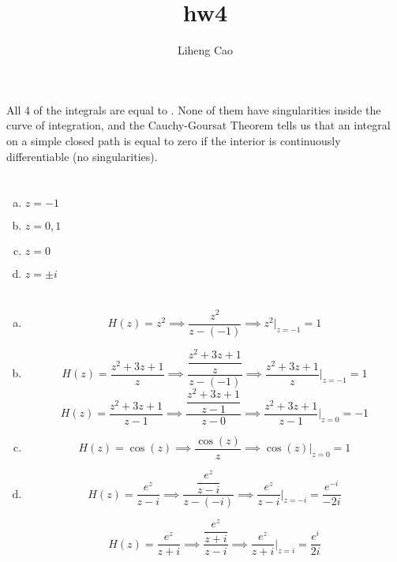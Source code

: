 \documentclass[12pt]{article}
\title{hw4}
\author{Liheng Cao}
\begin{document}
\maketitle

\section{}
All 4 of the integrals are equal to . None of them have singularities inside the curve of integration, and the Cauchy-Goursat Theorem tells us that an integral on a simple closed path is equal to zero if the interior is continuously differentiable (no singularities).
\newpage

\section{}
\begin{enumerate}[a)]
	\item $ z=-1 $
	
	\item $ z = 0, 1 $
	
	\item $ z = 0 $
	
	\item $ z = \pm{i} $
\end{enumerate}
\newpage

\section{}
\begin{enumerate}[a)]
	\item \[ H(z) = z^2 \implies \dfrac{z^2}{z-(-1)} \implies z^2\Bigg|_{z=-1} = \boxed{1}\]
	
	\item \[ H(z) = \dfrac{z^2+3z+1}{z} \implies \dfrac{\dfrac{z^2+3z+1}{z}}{z-(-1)} \implies \dfrac{z^2+3z+1}{z}\Bigg|_{z=-1}= \boxed{1} \]
	\[ H(z) = \dfrac{z^2+3z+1}{z-1} \implies \dfrac{\dfrac{z^2+3z+1}{z-1}}{z-0} \implies \dfrac{z^2+3z+1}{z-1}\Bigg|_{z=0}= \boxed{-1} \]
	
	\item \[ H(z) = \cos{(z)} \implies \dfrac{\cos{(z)}}{z} \implies \cos{(z)}\Bigg|_{z=0} = \boxed{1}\]
	
	\item \[ H(z) = \dfrac{e^z}{z-i} \implies \dfrac{\dfrac{e^z}{z-i}}{z-(-i)} \implies \dfrac{e^z}{z-i}\Bigg|_{z=-i}= \boxed{\dfrac{e^{-i}}{-2i}}\]
	
	\[ H(z) = \dfrac{e^z}{z+i} \implies \dfrac{\dfrac{e^z}{z+i}}{z-i} \implies \dfrac{e^z}{z+i}\Bigg|_{z=i}= \boxed{\dfrac{e^i}{2i}}\]
\end{enumerate}
\newpage
\end{document}
